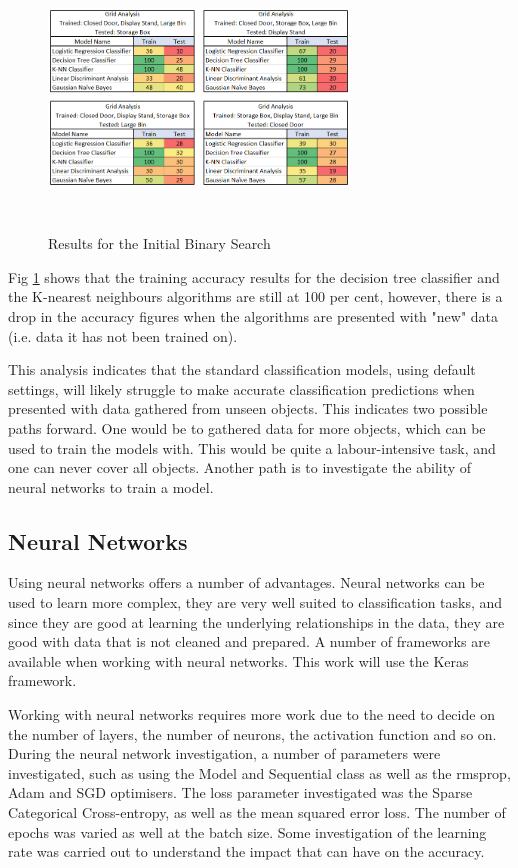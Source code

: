 \documentclass{svproc}
\begin{document}
\begin{figure}[ht]
\includegraphics[width=8cm, height=7cm]{images/new_data_results.png}
\centering
\caption{Results for the Initial Binary Search}
\label{fig:new_data_results}
\end{figure}

Fig \ref{fig:new_data_results} shows that the training accuracy results for the decision tree classifier and the K-nearest neighbours 
algorithms are still at 100 per cent, however, there is a drop in the accuracy figures when the algorithms are presented with "new" data 
(i.e. data it has not been trained on).

This analysis indicates that the standard classification models, using default settings, will likely struggle to make accurate 
classification predictions when presented with data gathered from unseen objects. This indicates two possible paths forward. One would be to 
gathered data for more objects, which can be used to train the models with. This would be quite a labour-intensive task, and one can never 
cover all objects. Another path is to investigate the ability of neural networks to train a model. 

\subsection{Neural Networks}
Using neural networks offers a number of advantages. Neural networks can be used to learn more complex, they are very well suited to 
classification tasks, and since they are good at learning the underlying relationships in the data, they are good with data that is not 
cleaned and prepared. A number of frameworks are available when working with neural networks. This work will use the Keras framework.

Working with neural networks requires more work due to the need to decide on the number of layers, the number of neurons, the activation 
function and so on. During the neural network investigation, a number of parameters were investigated, such as using the Model and Sequential 
class as well as the rmsprop, Adam and SGD optimisers. The loss parameter investigated was the Sparse Categorical Cross-entropy, as well as 
the mean squared error loss. The number of epochs was varied as well at the batch size. Some investigation of the learning rate was carried 
out to understand the impact that can have on the accuracy. 
\end{document}
